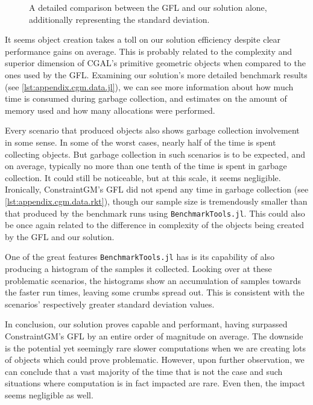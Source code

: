 \begin{figure}[htb]
  \centering
  \caption[GFL vs. Our solution]{\label{fig:eval.cgm.perferr}%
    A detailed comparison between the \ac{GFL} and our solution alone, 
    additionally representing the standard deviation.}
\end{figure}

It seems object creation takes a toll on our solution efficiency despite clear
performance gains on average.  This is probably related to the complexity and
superior dimension of \ac{CGAL}'s primitive geometric objects when compared to
the ones used by the \ac{GFL}.  Examining our solution's more detailed benchmark
results (see \cref{lst:appendix.cgm.data.jl}), we can see more information about
how much time is consumed during garbage collection, and estimates on the amount
of memory used and how many allocations were performed.

Every scenario that produced objects also shows garbage collection involvement
in some sense.  In some of the worst cases, nearly half of the time is spent
collecting objects.  But garbage collection in such scenarios is to be expected,
and on average, typically no more than one tenth of the time is spent in garbage
collection.  It could still be noticeable, but at this scale, it seems
negligible.  Ironically, ConstraintGM's \ac{GFL} did not spend any time in
garbage collection (see \cref{lst:appendix.cgm.data.rkt}), though our sample size
is tremendously smaller than that produced by the benchmark runs using
\texttt{BenchmarkTools.jl}.  This could also be once again related to the
difference in complexity of the objects being created by the \ac{GFL} and our
solution.

One of the great features \texttt{BenchmarkTools.jl} has is its capability of
also producing a histogram of the samples it collected.  Looking over at these
problematic scenarios, the histograms show an accumulation of samples towards
the faster run times, leaving some crumbs spread out.  This is consistent with
the scenarios' respectively greater standard deviation values.

In conclusion, our solution proves capable and performant, having surpassed
ConstraintGM's \ac{GFL} by an entire order of magnitude on average.  The
downside is the potential yet seemingly rare slower computations when we are
creating lots of objects which could prove problematic.  However, upon further
observation, we can conclude that a vast majority of the time that is not the
case and such situations where computation is in fact impacted are rare.  Even
then, the impact seems negligible as well.
